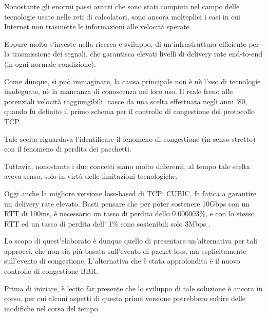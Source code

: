 Nonostante gli enormi passi avanti che sono stati compiuti nel campo delle tecnologie usate nelle reti di calcolatori, sono ancora molteplici i casi in cui Internet non trasmette le informazioni alle velocità sperate. \bigskip

Eppure molto s’investe nella ricerca e sviluppo, di un’infrastruttura efficiente per la trasmissione dei segnali, che garantisca elevati livelli di delivery rate end-to-end (in ogni normale condizione). \bigskip

Come dunque, si può immaginare, la causa principale non è nè l’uso di tecnologie inadeguate, nè la mancanza di conoscenza nel loro uso. Il reale freno alle potenziali velocità raggiungibili, nasce da una scelta effettuata negli anni '80, quando fu definito il primo schema per il controllo di congestione del protocollo TCP. \bigskip

Tale scelta riguardava l’identificare il fenomeno di congestione (in senso stretto) con il fenomeno di perdita dei pacchetti. \bigskip

Tuttavia, nonostante i due concetti siano molto differenti, al tempo tale scelta aveva senso, solo in virtù delle limitazioni tecnologiche. \bigskip

Oggi anche la migliore versione loss-based di TCP: CUBIC, fa fatica a garantire un delivery rate elevato. Basti pensare che per poter sostenere 10Gbps con un RTT di 100ms, è necessario un tasso di perdita dello 0.000003\%, e con lo stesso RTT ed un tasso di perdita dell’ 1\% sono sostenibili solo 3Mbps \cite[p.~12]{ietf:draft-ietf-tcpm-cubic-05}. \bigskip

Lo scopo di quest'elaborato è dunque quello di presentare un'alternativa per tali approcci, che non sia più basata sull'evento di packet loss, ma esplicitamente sull'evento di congestione. L'alternativa che è stata approfondita è il nuovo controllo di congestione BBR. \bigskip

Prima di iniziare, è lecito far presente che lo sviluppo di tale soluzione è ancora in corso, per cui alcuni aspetti di questa prima versione potrebbero subire delle modifiche nel corso del tempo.